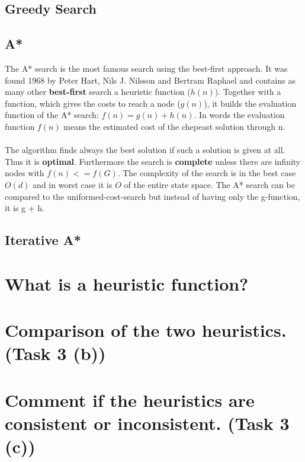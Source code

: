 \documentclass[11pt]{article}
\begin{document}
\subsection{Greedy Search}

\subsection{A*}
The A* search is the most famous search using the best-first approach. It was found 1968 by Peter Hart, Nils J. Nilsson and Bertram Raphael and contains as many other \textbf{best-first} search a heuristic function ($h(n)$). Together with a function, which gives the costs to reach a node ($g(n)$), it builds the evaluation function of the A* search: $f(n) = g(n) + h(n)$. In words the evaluation function $f(n)$ means the estimated cost of the chepeast solution through n.\\
\\
The algorithm finds always the best solution if such a  solution is given at all. Thus it is \textbf{optimal}. Furthermore the search is \textbf{complete} unless there are infinity nodes with $f(n) <= f(G)$. The complexity of the search is in the best case $O(d)$ and in worst case it is $O$ of the entire state space. The A* search can be compared to the uniformed-cost-search but instead of having only the g-function, it is g + h.

\subsection{Iterative A*}

\newpage
\section{What is a heuristic function?}

\newpage
\section{Comparison of the two heuristics. (Task 3 (b))}

\newpage
\section{Comment if the heuristics are consistent or inconsistent. (Task 3 (c))}
\end{document}
